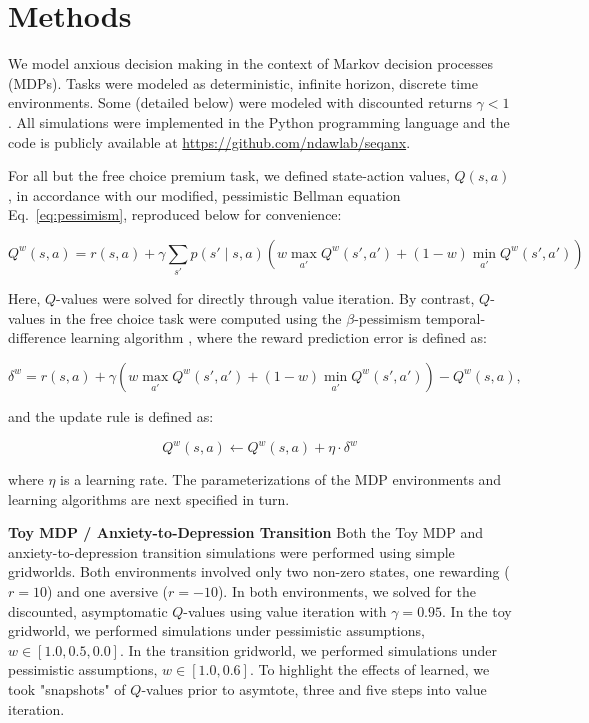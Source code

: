 \documentclass[11pt]{article} %
\begin{document}
\section{Methods}

We model anxious decision making in the context of Markov decision processes (MDPs). Tasks were modeled as deterministic, infinite horizon, discrete time environments. Some (detailed below) were modeled with discounted returns $\gamma < 1$. All simulations were implemented in the Python programming language and the code is publicly available at \url{https://github.com/ndawlab/seqanx}.

For all but the free choice premium task, we defined state-action values, $Q(s,a)$, in accordance with our modified, pessimistic Bellman equation Eq.~\ref{eq:pessimism}, reproduced below for convenience:

\begin{equation*}
Q^w(s,a) = r(s,a) + \gamma \sum_{s'} p(s' \mid s,a) \left( w \max_{a'} Q^w(s',a') + (1 - w) \min_{a'} Q^w(s',a') \right)
\end{equation*}

Here, $Q$-values were solved for directly through value iteration. \citep{SuttonBarto2018} By contrast, $Q$-values in the free choice task were computed using the $\beta$-pessimism temporal-difference learning algorithm \citep{Gaskett2003}, where the reward prediction error is defined as:

\begin{equation*}
\delta^w = r(s,a) + \gamma \left( w \max_{a'} Q^w(s',a') + (1 - w) \min_{a'} Q^w(s',a') \right) - Q^w(s,a), 
\end{equation*}

and the update rule is defined as:

\begin{equation*}
Q^w(s,a) \leftarrow Q^w(s,a) + \eta \cdot \delta^w
\end{equation*}

where $\eta$ is a learning rate. The parameterizations of the MDP environments and learning algorithms are next specified in turn.

\textbf{Toy MDP / Anxiety-to-Depression Transition} Both the Toy MDP and anxiety-to-depression transition simulations were performed using simple gridworlds. Both environments involved only two non-zero states, one rewarding ($r=10$) and one aversive ($r=-10$). In both environments, we solved for the discounted, asymptomatic $Q$-values using value iteration with $\gamma = 0.95$. In the toy gridworld, we performed simulations under pessimistic assumptions, $w \in [1.0, 0.5, 0.0]$. In the transition gridworld, we performed simulations under pessimistic assumptions, $w \in [1.0, 0.6]$. To highlight the effects of learned, we took "snapshots" of $Q$-values prior to asymtote, three and five steps into value iteration. 
\end{document}
